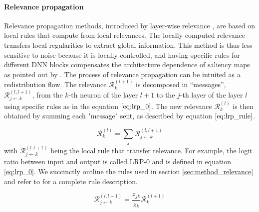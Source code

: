 \paragraph{Relevance propagation}
Relevance propagation methods, introduced by layer-wise relevance \cite{Bach2015OnPE}, are based on local rules that compute from local relevances.
The locally computed relevance transfers local regularities to extract global information. This method is thus less sensitive to noise because it is locally controlled, and having specific rules for different DNN blocks compensates the architecture dependence of saliency maps as pointed out by \cite{Adebayo2018SanityCF}.
The process of relevance propagation can be intuited as a redistribution flow. The relevance $\mathcal{R}^{(l+1)}_k$ is decomposed in ``messages'', $\mathcal{R}^{(l,l+1)}_{j\leftarrow k}$, from the $k$-th neuron of the layer $l+1$ to the $j$-th layer of the layer $l$ using specific rules as in the equation $\ref{eq:lrp_0}$. The new relevance $\mathcal{R}^{(l)}_k$ is then obtained by summing each "message" sent, as described by equation $\ref{eq:lrp_rule}$.

\begin{equation}
\label{eq:lrp_rule}
\mathcal{R}^{(l)}_k=\sum_j\mathcal{R}^{(l,l+1)}_{j\leftarrow k}
\end{equation}
with $\mathcal{R}^{(l,l+1)}_{j\leftarrow k}$ being the local rule that transfer relevance. For example, the logit ratio between input and output is called LRP-0 and is defined in equation \ref{eq:lrp_0}. We succinctly outline the rules used in section \ref{sec:method_relevance} and refer to \cite{2019LayerWiseRP} for a complete rule description.

\begin{equation}
\label{eq:lrp_0}
\mathcal{R}^{(l,l+1)}_{j\leftarrow k} = \dfrac{z_{jk} }{z_k}\mathcal{R}^{(l+1)}_k
\end{equation}
